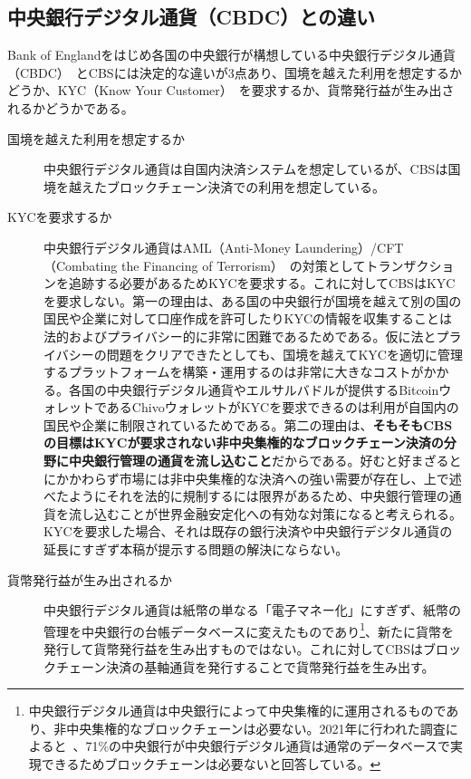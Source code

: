 \documentclass[dvipdfmx,a4paper]{jsarticle}
\begin{document}
\subsection{中央銀行デジタル通貨（CBDC）との違い}

Bank of Englandをはじめ各国の中央銀行が構想している中央銀行デジタル通貨（CBDC）~\cite{cbdc1,cbdc2}とCBSには決定的な違いが3点あり、国境を越えた利用を想定するかどうか、KYC（Know Your Customer）~\cite{parra2017kyc}を要求するか、貨幣発行益が生み出されるかどうかである。

\begin{description}
\item[国境を越えた利用を想定するか] 中央銀行デジタル通貨は自国内決済システムを想定しているが、CBSは国境を越えたブロックチェーン決済での利用を想定している。
\item[KYCを要求するか] 中央銀行デジタル通貨はAML（Anti-Money Laundering）/CFT（Combating the Financing of Terrorism）~\cite{verdugo2011compliance}の対策としてトランザクションを追跡する必要があるためKYCを要求する。これに対してCBSはKYCを要求しない。第一の理由は、ある国の中央銀行が国境を越えて別の国の国民や企業に対して口座作成を許可したりKYCの情報を収集することは法的およびプライバシー的に非常に困難であるためである。仮に法とプライバシーの問題をクリアできたとしても、国境を越えてKYCを適切に管理するプラットフォームを構築・運用するのは非常に大きなコストがかかる。各国の中央銀行デジタル通貨やエルサルバドルが提供するBitcoinウォレットであるChivoウォレットがKYCを要求できるのは利用が自国内の国民や企業に制限されているためである。第二の理由は、\textbf{そもそもCBSの目標はKYCが要求されない非中央集権的なブロックチェーン決済の分野に中央銀行管理の通貨を流し込むこと}だからである。好むと好まざるとにかかわらず市場には非中央集権的な決済への強い需要が存在し、上で述べたようにそれを法的に規制するには限界があるため、中央銀行管理の通貨を流し込むことが世界金融安定化への有効な対策になると考えられる。KYCを要求した場合、それは既存の銀行決済や中央銀行デジタル通貨の延長にすぎず本稿が提示する問題の解決にならない。
\item[貨幣発行益が生み出されるか] 中央銀行デジタル通貨は紙幣の単なる「電子マネー化」にすぎず、紙幣の管理を中央銀行の台帳データベースに変えたものであり\footnote{中央銀行デジタル通貨は中央銀行によって中央集権的に運用されるものであり、非中央集権的なブロックチェーンは必要ない。2021年に行われた調査によると~\cite{ubssurvey}、71\%の中央銀行が中央銀行デジタル通貨は通常のデータベースで実現できるためブロックチェーンは必要ないと回答している。}、新たに貨幣を発行して貨幣発行益を生み出すものではない。これに対してCBSはブロックチェーン決済の基軸通貨を発行することで貨幣発行益を生み出す。
\end{description}
\end{document}
